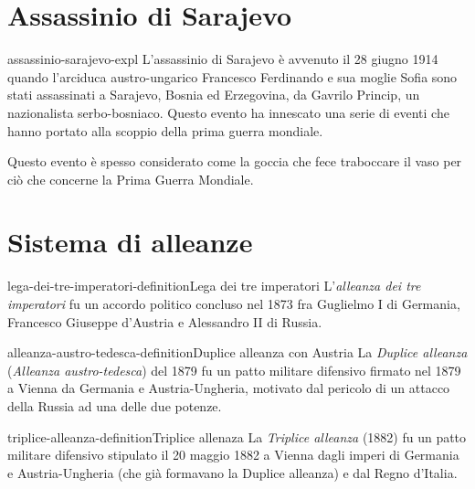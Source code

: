 \documentclass[preview]{standalone}
\begin{document}
\section{Assassinio di Sarajevo}

\begin{snippet}{assassinio-sarajevo-expl}
    L'assassinio di Sarajevo è avvenuto il 28 giugno 1914
    quando l'arciduca austro-ungarico Francesco Ferdinando e
    sua moglie Sofia sono stati assassinati a Sarajevo,
    Bosnia ed Erzegovina, da Gavrilo Princip,
    un nazionalista serbo-bosniaco.
    Questo evento ha innescato una serie di eventi che hanno portato alla
    scoppio della prima guerra mondiale.

    Questo evento è spesso considerato come la goccia che fece traboccare il vaso
    per ciò che concerne la Prima Guerra Mondiale.
\end{snippet}

\section{Sistema di alleanze}

\begin{snippetdefinition}{lega-dei-tre-imperatori-definition}{Lega dei tre imperatori}
    L'\textit{alleanza dei tre imperatori}
    fu un accordo politico concluso nel
    1873 fra Guglielmo I di Germania, Francesco Giuseppe d'Austria e Alessandro II di Russia.
\end{snippetdefinition}


\begin{snippetdefinition}{alleanza-austro-tedesca-definition}{Duplice alleanza con Austria}
    La \textit{Duplice alleanza} (\textit{Alleanza austro-tedesca})
    del 1879 fu un patto militare difensivo firmato nel 1879 a Vienna da Germania
    e Austria-Ungheria, motivato dal pericolo di un attacco della Russia ad una delle due potenze.
\end{snippetdefinition}

\begin{snippetdefinition}{triplice-alleanza-definition}{Triplice allenaza}
    La \textit{Triplice alleanza} (1882)
    fu un patto militare difensivo stipulato il 20 maggio 1882 a
    Vienna dagli imperi di Germania e Austria-Ungheria
    (che già formavano la Duplice alleanza) e dal Regno d'Italia. 
\end{snippetdefinition}
\end{document}
